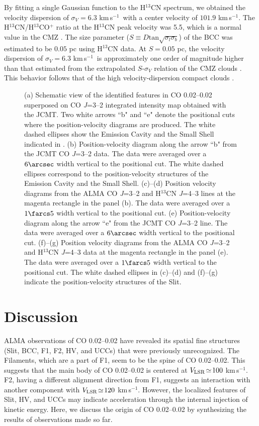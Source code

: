 \documentclass[twocolumn]{aastex631}
\newcommand\kms{\hbox{km$\,$s$^{-1}$}}
\newcommand\VLSR{\hbox{$V_{\rm LSR}$}}
\begin{document}
By fitting a single Gaussian function to the H$^{13}$CN spectrum, we obtained the velocity dispersion of $\sigma_{V}\! =\! 6.3$ \kms\ with a center velocity of $101.9$ \kms . The H$^{13}$CN/H$^{13}$CO$^{+}$ ratio at the H$^{13}$CN peak velocity was 5.5, which is a normal value in the CMZ \citep[2.6--6.6;][]{Jones12}. The size parameter ($S\!\equiv\! D\mathrm{tan}\sqrt{\sigma_{l}\sigma_{b}}$) of the BCC was estimated to be $0.05$ pc using H$^{13}$CN data. At $S\! =\! 0.05$  pc, the velocity dispersion of $\sigma_{V}\! =\! 6.3$ \kms\ is approximately one order of magnitude higher than that estimated from the extrapolated $S$-$\sigma_{V}$ relation of the CMZ clouds \citep{Oka01b,Shetty12}. This behavior follows that of the high velocity-dispersion compact clouds \citep{Tokuyama17,Oka22}.

\begin{figure*}[htbp]
\centering
{}
\caption{(a) Schematic view of the identified features in CO 0.02--0.02 superposed on CO {\it J}=3--2 integrated intensity map obtained with the JCMT. Two white arrows ``b" and ``e" denote the positional cuts where the position-velocity diagrams are produced. The white dashed ellipses show the Emission Cavity and the Small Shell indicated in \citet{Oka08}. (b) Position-velocity diagram along the arrow ``b" from the JCMT CO {\it J}=3--2 data. The data were averaged over a $6\arcsec$ width vertical to the positional cut. The white dashed ellipses correspond to the position-velocity structures of the Emission Cavity and the Small Shell. (c)--(d) Position velocity diagrams from the ALMA CO {\it J}=3--2 and H$^{13}$CN {\it J}=4--3 lines at the magenta rectangle in the panel (b). The data were averaged over a $1\farcs 5$ width vertical to the positional cut. (e) Position-velocity diagram along the arrow ``e" from the JCMT CO {\it J}=3--2 line. The data were averaged over a $6\arcsec$ width vertical to the positional cut. (f)--(g) Position velocity diagrams from the ALMA CO {\it J}=3--2 and H$^{13}$CN {\it J}=4--3 data at the magenta rectangle in the panel (e). The data were averaged over a $1\farcs 5$ width vertical to the positional cut. The white dashed ellipses in (c)--(d) and (f)--(g) indicate the position-velocity structures of the Slit.
\label{fig:endogen}}
\end{figure*}


\section{Discussion}
ALMA observations of CO 0.02--0.02 have revealed its spatial fine structures (Slit, BCC, F1, F2, HV, and UCCs) that were previously unrecognized. The Filaments, which are a part of F1, seem to be the spine of CO 0.02--0.02. This suggests that the main body of CO 0.02--0.02 is centered at $\VLSR\!\simeq\! 100$ \kms . F2, having a different alignment direction from F1, suggests an interaction with another component with $\VLSR\!\simeq\! 120$ \kms . However, the localized features of Slit, HV, and UCCs may indicate acceleration through the internal injection of kinetic energy. Here, we discuss the origin of CO 0.02--0.02 by synthesizing the results of observations made so far.
\end{document}
